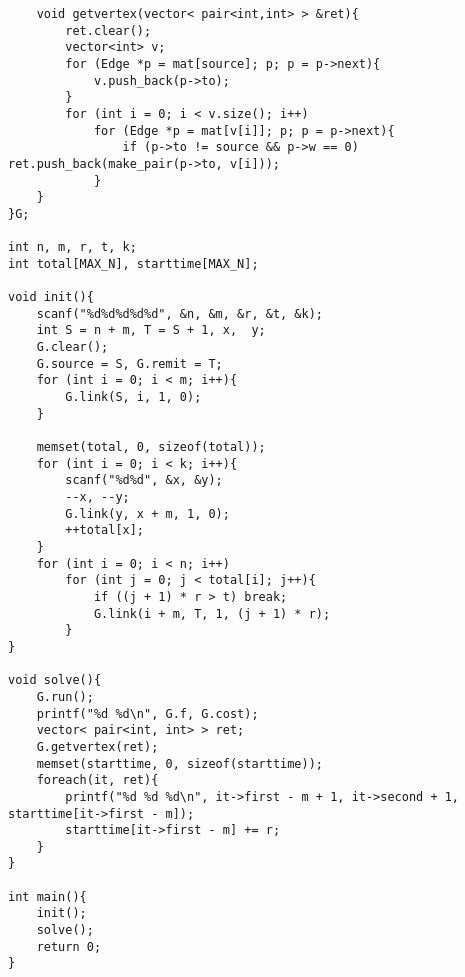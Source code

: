 \begin{verbatim}
    void getvertex(vector< pair<int,int> > &ret){
        ret.clear();
        vector<int> v;
        for (Edge *p = mat[source]; p; p = p->next){
            v.push_back(p->to);
        }
        for (int i = 0; i < v.size(); i++)
            for (Edge *p = mat[v[i]]; p; p = p->next){
                if (p->to != source && p->w == 0) ret.push_back(make_pair(p->to, v[i]));
            }
    }
}G;

int n, m, r, t, k;
int total[MAX_N], starttime[MAX_N];

void init(){
    scanf("%d%d%d%d%d", &n, &m, &r, &t, &k);
    int S = n + m, T = S + 1, x,  y;
    G.clear();
    G.source = S, G.remit = T;
    for (int i = 0; i < m; i++){
        G.link(S, i, 1, 0);
    }

    memset(total, 0, sizeof(total));
    for (int i = 0; i < k; i++){
        scanf("%d%d", &x, &y);
        --x, --y;
        G.link(y, x + m, 1, 0);
        ++total[x];
    }
    for (int i = 0; i < n; i++)
        for (int j = 0; j < total[i]; j++){
            if ((j + 1) * r > t) break;
            G.link(i + m, T, 1, (j + 1) * r);
        }
}

void solve(){
    G.run();
    printf("%d %d\n", G.f, G.cost);
    vector< pair<int, int> > ret;
    G.getvertex(ret);
    memset(starttime, 0, sizeof(starttime));
    foreach(it, ret){
        printf("%d %d %d\n", it->first - m + 1, it->second + 1, starttime[it->first - m]);
        starttime[it->first - m] += r;
    }
}

int main(){
    init();
    solve();
    return 0;
}
\end{verbatim}

